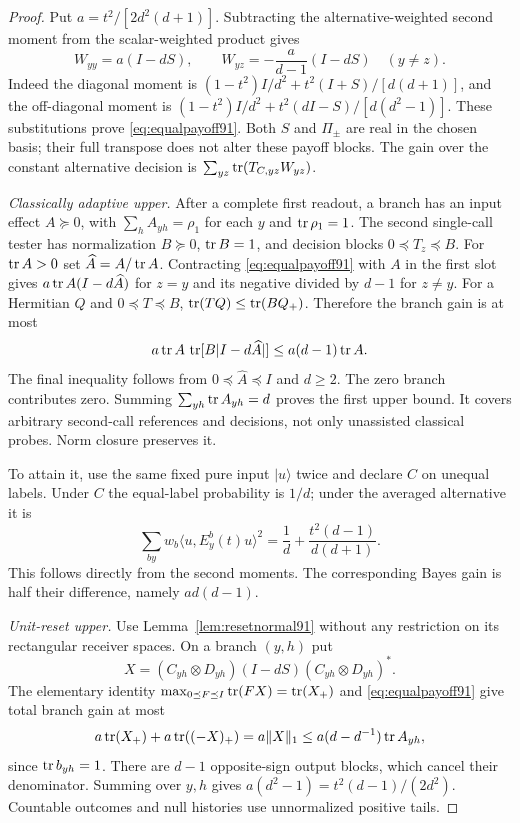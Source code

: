 \begin{proof}
Put $a=t^2/[2d^2(d+1)]$.  Subtracting the alternative-weighted
second moment from the scalar-weighted product gives
\begin{equation}\label{eq:equalpayoff91}
 W_{yy}=a(I-dS),\qquad
 W_{yz}=-\frac{a}{d-1}(I-dS)\quad(y\ne z).
\end{equation}
Indeed the diagonal moment is
$(1-t^2)I/d^2+t^2(I+S)/[d(d+1)]$, and the off-diagonal
moment is $(1-t^2)I/d^2+t^2(dI-S)/[d(d^2-1)]$.
These substitutions prove \eqref{eq:equalpayoff91}.
Both $S$ and $\Pi_\pm$ are real in the chosen basis; their full
transpose does not alter these payoff blocks.  The gain over the
constant alternative decision is $\sum_{yz}\operatorname{tr}(T_{C,yz}W_{yz})$.

\emph{Classically adaptive upper.}
After a complete first readout, a branch has an input effect
$A\succeq0$, with $\sum_h A_{yh}=\rho_1$ for each $y$ and
$\operatorname{tr}\rho_1=1$.  The second single-call tester has normalization
$B\succeq0$, $\operatorname{tr} B=1$, and decision blocks $0\preceq T_z\preceq B$.
For $\operatorname{tr} A>0$ set $\widehat A=A/\operatorname{tr} A$.
Contracting \eqref{eq:equalpayoff91} with $A$ in the first slot gives
$a\operatorname{tr} A(I-d\widehat A)$ for $z=y$ and its negative divided by
$d-1$ for $z\ne y$.  For a Hermitian $Q$ and $0\preceq T\preceq B$,
$\operatorname{tr}(TQ)\le\operatorname{tr}(BQ_+)$.  Therefore the branch gain is at most
\[
 a\operatorname{tr} A\,\operatorname{tr}[B|I-d\widehat A|]\le a(d-1)\operatorname{tr} A.
\]
The final inequality follows from $0\preceq\widehat A\preceq I$ and
$d\ge2$.  The zero branch contributes zero.
Summing $\sum_{yh}\operatorname{tr} A_{yh}=d$ proves the first upper bound.
It covers arbitrary second-call references and decisions, not only
unassisted classical probes.  Norm closure preserves it.

To attain it, use the same fixed pure input $|u\rangle$ twice and
declare $C$ on unequal labels.  Under $C$ the equal-label probability is
$1/d$; under the averaged alternative it is
\[
 \sum_{by}w_b\langle u,E_y^b(t)u\rangle^2
 =\frac1d+\frac{t^2(d-1)}{d(d+1)}.
\]
This follows directly from the second moments.  The corresponding
Bayes gain is half their difference, namely $ad(d-1)$.

\emph{Unit-reset upper.}
Use Lemma~\ref{lem:resetnormal91} without any restriction on its
rectangular receiver spaces.  On a branch $(y,h)$ put
\[
 X=(C_{yh}\otimes D_{yh})(I-dS)(C_{yh}\otimes D_{yh})^*.
\]
The elementary identity
$\max_{0\preceq F\preceq I}\operatorname{tr}(FX)=\operatorname{tr}(X_+)$ and
\eqref{eq:equalpayoff91} give total branch gain at most
\[
 a\operatorname{tr}(X_+)+a\operatorname{tr}((-X)_+)=a\|X\|_1
 \le a(d-d^{-1})\operatorname{tr} A_{yh},
\]
since $\operatorname{tr} b_{yh}=1$.  There are $d-1$ opposite-sign output blocks,
which cancel their denominator.  Summing over $y,h$ gives
$a(d^2-1)=t^2(d-1)/(2d^2)$.
Countable outcomes and null histories use unnormalized positive tails.


\end{proof}
